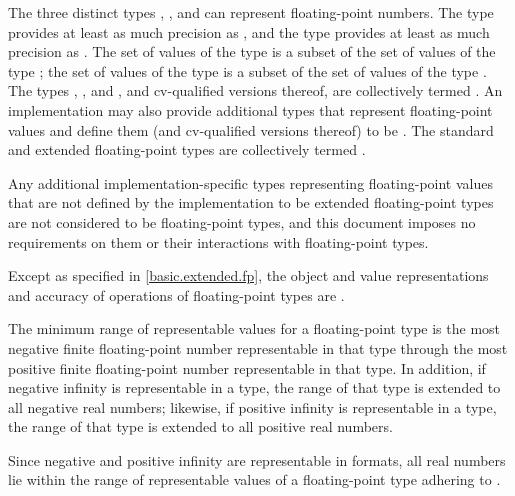 \pnum
{}%
The three distinct types
%
,
%
,
and
%
can represent floating-point numbers.
The type  provides at least as much
precision as , and the type  provides at
least as much precision as . The set of values of the type
 is a subset of the set of values of the type
; the set of values of the type  is a subset
of the set of values of the type .
The types
, , and ,
and cv-qualified versions thereof,
are collectively termed
.
An implementation may also provide additional types
that represent floating-point values and define them (and cv-qualified versions thereof) to be
.
The standard and extended floating-point types
are collectively termed .
\begin{note}
Any additional implementation-specific types representing floating-point values
that are not defined by the implementation to be extended floating-point types
are not considered to be floating-point types, and
this document imposes no requirements on them or
their interactions with floating-point types.
\end{note}
Except as specified in \ref{basic.extended.fp},
the object and value representations and accuracy of operations
of floating-point types are .

\pnum
The minimum range of representable values for a floating-point type is
the most negative finite floating-point number representable
in that type through
the most positive finite floating-point number representable in that type.
In addition, if negative infinity is representable in a type,
the range of that type is extended to all negative real numbers;
likewise, if positive infinity is representable in a type,
the range of that type is extended to all positive real numbers.
\begin{note}
Since negative and positive infinity are representable
in \IsoFloatUndated{} formats,
all real numbers lie within the range of representable values of
a floating-point type adhering to \IsoFloatUndated{}.
\end{note}

